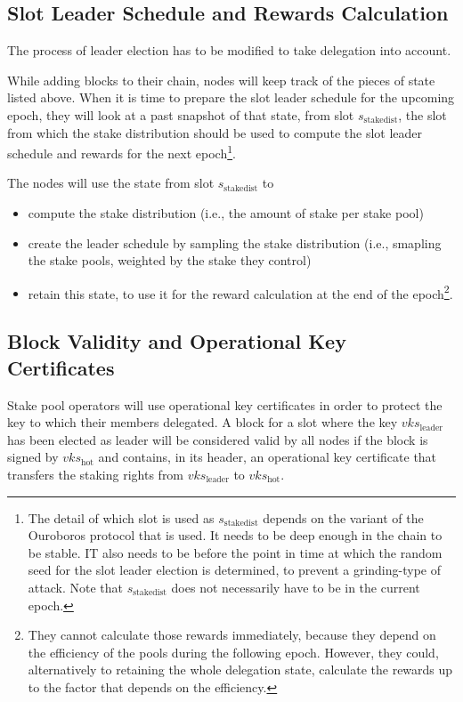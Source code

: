 \documentclass[11pt,a4paper]{article}
\begin{document}
\subsection{Slot Leader Schedule and Rewards Calculation}
\label{slot-leader-schedule}

The process of leader election has to be modified to take delegation
into account.

While adding blocks to their chain, nodes will keep track of the
pieces of state listed above. When it is time to prepare the slot
leader schedule for the upcoming epoch, they will look at a past
snapshot of that state, from slot \(s_\text{stakedist}\), the slot
from which the stake distribution should be used to compute the slot
leader schedule and rewards for the next epoch\footnote{The detail of
  which slot is used as \(s_\text{stakedist}\) depends on the variant
  of the Ouroboros protocol that is used. It needs to be deep enough
  in the chain to be stable. IT also needs to be before the point in
  time at which the random seed for the slot leader election is
  determined, to prevent a grinding-type of attack. Note that
  \(s_\text{stakedist}\) does not necessarily have to be in the
  current epoch.}.

The nodes will use the state from slot \(s_\text{stakedist}\) to
\begin{itemize}
\item compute the stake distribution (i.e., the amount of stake per
  stake pool)
\item create the leader schedule by sampling the stake distribution
  (i.e., smapling the stake pools, weighted by the stake they control)
\item retain this state, to use it for the reward calculation at the
  end of the epoch\footnote{They cannot calculate those rewards
    immediately, because they depend on the efficiency of the pools
    during the following epoch. However, they could, alternatively to
    retaining the whole delegation state, calculate the rewards up to
    the factor that depends on the efficiency.}.
\end{itemize}

\subsection{Block Validity and Operational Key Certificates}
\label{block-validity-and-operational-key-certificates}

Stake pool operators will use operational key certificates in order to protect
the key to which their members delegated. A block for a slot where the key
\(vks_\text{leader}\) has been elected as leader will be considered valid by all
nodes if the block is signed by \(vks_\text{hot}\) and contains, in its header,
an operational key certificate that transfers the staking rights from
\(vks_\text{leader}\) to \(vks_\text{hot}\).
\end{document}
